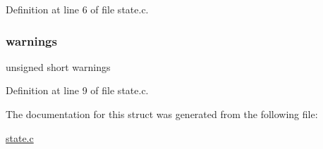 Definition at line 6 of file state.\+c.

\mbox{\label{structstate_a8f15148e128309c287fada7b1fa5090c}} 
\subsubsection{\texorpdfstring{warnings}{warnings}}
{\footnotesize\ttfamily unsigned short warnings}



Definition at line 9 of file state.\+c.



The documentation for this struct was generated from the following file\+:\begin{DoxyCompactItemize}
\item 
\mbox{\hyperlink{state_8c}{state.\+c}}\end{DoxyCompactItemize}
